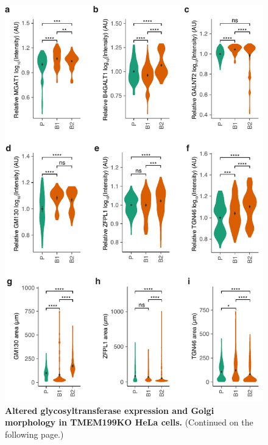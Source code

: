 \clearpage

\begin{figure}
    \includegraphics[keepaspectratio=true,width=\textwidth,height=\textheight]{chapters/chapter4/chapter4_SupplementaryFigure4.pdf}
    \caption{\textbf{Altered glycosyltransferase expression and Golgi morphology in TMEM199KO HeLa cells.} (Continued on the following page.)}
    \label{fig:ch4supfig4}
\end{figure}

